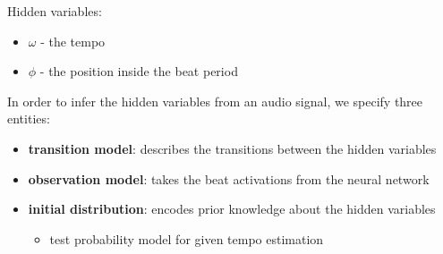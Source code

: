 \documentclass{scrartcl}
\begin{document}
\vspace{1em}
Hidden variables: 
\begin{itemize}
\item $\omega$ - the tempo
\item $\phi$ - the position inside the beat period
\end{itemize}

\vspace{1em}
In order to infer the hidden variables from an audio signal, we specify three entities:

\begin{itemize}
\item \textbf{transition model}: describes the transitions between the hidden variables 
\item \textbf{observation model}: takes the beat activations from the neural network
\item \textbf{initial distribution}: encodes prior knowledge about the hidden variables
\begin{itemize}
\item test probability model for given tempo estimation 
\end{itemize}
\end{itemize}
\end{document}

